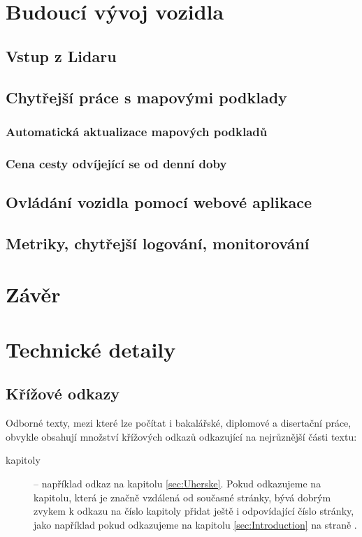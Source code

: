 \documentclass[czech,bachelor,dept460,male,cpp,cpdeclaration]{diploma}
\begin{document}
\section{Budoucí vývoj vozidla}

\subsection{Vstup z Lidaru}

\subsection{Chytřejší práce s mapovými podklady}

\subsubsection{Automatická aktualizace mapových podkladů}

\subsubsection{Cena cesty odvíjející se od denní doby}

\subsection{Ovládání vozidla pomocí webové aplikace} \label{web-app}

\subsection{Metriky, chytřejší logování, monitorování}

\section{Závěr}

\section{Technické detaily}

\subsection{Křížové odkazy}
\label{sec:CrossReferences}
Odborné texty, mezi které lze počítat i bakalářské, diplomové a disertační práce, obvykle obsahují množství křížových odkazů odkazující na nejrůznější části textu:
\begin{description}
	\item [kapitoly] -- například odkaz na kapitolu \ref{sec:Uherske}. Pokud odkazujeme na kapitolu, která je značně vzdálená od současné stránky, bývá dobrým zvykem k odkazu na číslo kapitoly přidat ještě i odpovídající číslo stránky, jako například pokud odkazujeme na kapitolu \ref{sec:Introduction} na straně \pageref{sec:Introduction}.
\end{description}
\end{document}
